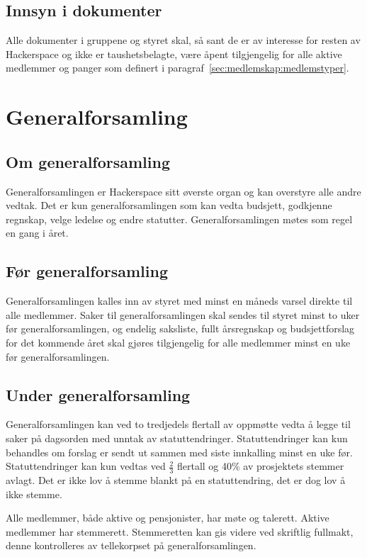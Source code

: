 \subsection{Innsyn i dokumenter}\label{sec:struktur:innsyn}
Alle dokumenter i gruppene og styret skal, så sant de er av interesse for resten av Hackerspace og ikke er taushetsbelagte, være åpent tilgjengelig for alle aktive medlemmer og panger som definert i paragraf~\ref{sec:medlemskap:medlemstyper}.


\section{Generalforsamling}\label{sec:generalforsamling}
\subsection{Om generalforsamling}\label{sec:generalforsamling:om}
Generalforsamlingen er Hackerspace sitt øverste organ og kan overstyre alle andre vedtak.
Det er kun generalforsamlingen som kan vedta budsjett, godkjenne regnskap, velge ledelse og endre statutter.
Generalforsamlingen møtes som regel en gang i året.

\subsection{Før generalforsamling}\label{sec:generalforsamling:før}
Generalforsamlingen kalles inn av styret med minst en måneds varsel direkte til alle medlemmer.
Saker til generalforsamlingen skal sendes til styret minst to uker før generalforsamlingen, og endelig saksliste, fullt årsregnskap og budsjettforslag for det kommende året skal gjøres tilgjengelig for alle medlemmer minst en uke før generalforsamlingen.

\subsection{Under generalforsamling}\label{sec:generalforsamling:under}
Generalforsamlingen kan ved to tredjedels flertall av oppmøtte vedta å legge til saker på dagsorden med unntak av statuttendringer.
Statuttendringer kan kun behandles om forslag er sendt ut sammen med siste innkalling minst en uke før.
Statuttendringer kan kun vedtas ved $\frac{2}{3}$ flertall og 40\% av prosjektets stemmer avlagt.
Det er ikke lov å stemme blankt på en statuttendring, det er dog lov å ikke stemme.

Alle medlemmer, både aktive og pensjonister, har møte og talerett.
Aktive medlemmer har stemmerett.
Stemmeretten kan gis videre ved skriftlig fullmakt, denne kontrolleres av tellekorpset på generalforsamlingen.

